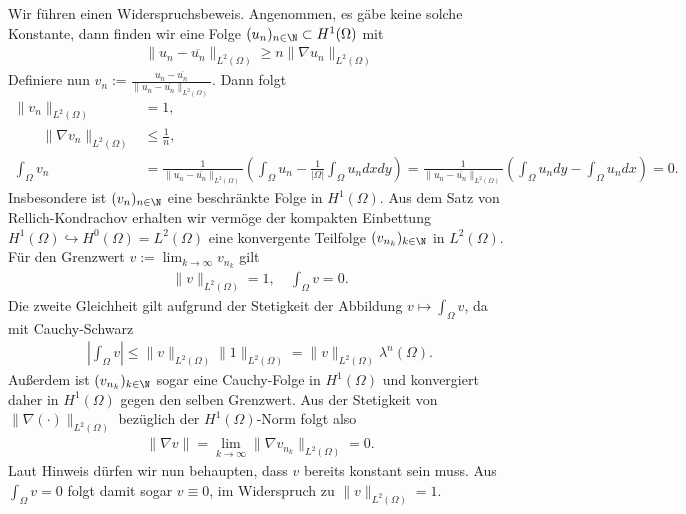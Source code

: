 \begin{solution}

Wir führen einen Widerspruchsbeweis. Angenommen, es gäbe keine solche Konstante,
dann finden wir eine Folge $(u_n)_{n \in \N} \subset H^1(\Omega)$ mit
\begin{align*}
  \|u_n - \overline{u_n}\|_{L^2(\Omega)} \geq n\|\nabla u_n\|_{L^2(\Omega)}
\end{align*}
Definiere nun $v_n := \frac{u_n - \overline{u_n}}{\|u_n - \overline{u_n}\|_{L^2(\Omega)}}$.
Dann folgt
\begin{align*}
  \|v_n\|_{L^2(\Omega)} &= 1, \\
  \qquad \|\nabla v_n\|_{L^2(\Omega)} &\leq \frac{1}{n}, \\
  \int_\Omega v_n &= \frac{1}{\|u_n -\overline{u_n}\|_{L^2(\Omega)}}
  \left(\int_{\Omega}u_n - \frac{1}{|\Omega|}\int_\Omega u_n dx dy\right)
  = \frac{1}{\|u_n -\overline{u_n}\|_{L^2(\Omega)}}
  \left(\int_{\Omega}u_n dy - \int_\Omega u_n dx\right) = 0.
\end{align*}
Insbesondere ist $(v_n)_{n \in \N}$ eine beschränkte Folge in $H^1(\Omega)$.
Aus dem Satz von Rellich-Kondrachov erhalten wir vermöge der kompakten Einbettung
$H^1(\Omega) \hookrightarrow H^0(\Omega) = L^2(\Omega)$ eine konvergente Teilfolge
$(v_{n_k})_{k\in \N}$ in $L^2(\Omega)$. Für den Grenzwert $v := \lim_{k \to \infty} v_{n_k}$ gilt
\begin{align*}
  \|v\|_{L^2(\Omega)} = 1, \quad \int_\Omega v = 0.
\end{align*}
Die zweite Gleichheit gilt aufgrund der Stetigkeit der Abbildung $v \mapsto \int_\Omega v$, da
mit Cauchy-Schwarz
\begin{align*}
  \left|\int_\Omega v\right| \leq \|v\|_{L^2(\Omega)}\|1\|_{L^2(\Omega)} = \|v\|_{L^2(\Omega)}\lambda^n(\Omega).
\end{align*}
Außerdem ist $(v_{n_k})_{k \in \N}$ sogar eine Cauchy-Folge in $H^1(\Omega)$
und konvergiert daher in $H^1(\Omega)$ gegen den selben Grenzwert.
Aus der Stetigkeit von $\|\nabla(\cdot)\|_{L^2(\Omega)}$ bezüglich der $H^1(\Omega)$-Norm
folgt also
\begin{align*}
  \|\nabla v\| = \lim_{k \to \infty}\|\nabla v_{n_k}\|_{L^2(\Omega)} = 0.
\end{align*}
Laut Hinweis dürfen wir nun behaupten, dass $v$ bereits konstant sein muss.
Aus $\int_\Omega v = 0$ folgt damit sogar $v \equiv 0$, im Widerspruch zu $\|v\|_{L^2(\Omega)} = 1$.
\end{solution}

